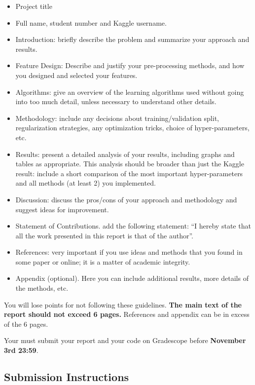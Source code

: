 \documentclass[12pt]{article}
\begin{document}
\begin{itemize}
  \item Project title
  \item Full name, student number and Kaggle username.
  \item Introduction: briefly describe the problem and summarize your approach and results.
  \item Feature Design: Describe and justify your pre-processing methods, and how you designed and selected your features.
  \item Algorithms: give an overview of the learning algorithms used without going into too much detail, unless necessary to understand other details.
  \item Methodology: include any decisions about training/validation split, regularization strategies, any optimization tricks, choice of hyper-parameters, etc.
  \item Results: present a detailed analysis of your results, including graphs and tables as appropriate. This analysis should be broader than just the Kaggle result: include a short comparison of the most important hyper-parameters and all methods (at least 2) you implemented.
  \item Discussion: discuss the pros/cons of your approach and methodology and suggest ideas for improvement.
  \item  Statement of Contributions. add the following statement: ``I hereby state that all the work presented in this report is that of the author''.
  \item References: very important if you use ideas and methods that you found in some paper or online; it is a matter of academic integrity.
  \item Appendix (optional). Here you can include additional results, more details of the methods, etc.
  \end{itemize}
  
You will lose points for not following these guidelines. \textbf{The main text of the report should not exceed 6 pages.} References and appendix can be in excess of the 6 pages. 

Your must submit your report and your code on Gradescope before \textbf{November 3rd 23:59}.

\subsection*{Submission Instructions}
 
\end{document}
